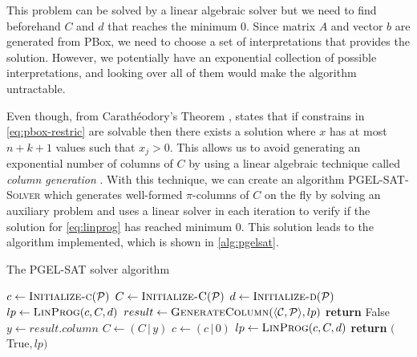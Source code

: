 This problem can be solved by a linear algebraic solver but we need to find beforehand $C$ and $d$ that reaches the minimum 0. Since matrix $A$ and vector $b$ are generated from PBox, we need to choose a set of interpretations that provides the solution. However, we potentially have an exponential collection of possible interpretations, and looking over all of them would make the algorithm untractable. 

Even though, from Carathéodory's Theorem \citep{eckhoff1993helly}, \citet{Fin2020} states that if constrains in \autoref{eq:pbox-restric} are solvable then there exists  a solution where $x$ has at most $n + k + 1$ values such that $x_j > 0$. This allows us to avoid generating an exponential number of columns of $C$ by using a linear algebraic technique called \emph{column generation} \citep{gilmore1961linear,gilmore1963linear}. With this technique, we can create an algorithm \textsc{PGEL-SAT-Solver} which generates well-formed $\pi$-columns of $C$ on the fly by solving an auxiliary problem and uses a linear solver in each iteration to verify if the solution for \autoref{eq:linprog} has reached minimum 0. This solution leads to the algorithm implemented, which is shown in \autoref{alg:pgelsat}.

\begin{algorithm}
	\caption{The PGEL-SAT solver algorithm}
	\label{alg:pgelsat}
	\begin{algorithmic}[1]
		\State $c \gets \Call{Initialize-c}{\PP}$
		\State $C \gets \Call{Initialize-C}{\PP}$
		\State $d \gets \Call{Initialize-d}{\PP}$
		\Statex
		\State $lp \gets \Call{LinProg}{c, C, d}$
		\Statex
		\State $result \gets \Call{GenerateColumn}{\tuple{\CC, \PP}, lp}$
		\State \textbf{return} False 
		\EndIf
		\Statex
		\State $y \gets result.column$ 
		\State $C \gets ( C \, | \, y) $
		\State $c \gets (c \, | \, 0)$
		\State $lp \gets \Call{LinProg}{c, C, d}$
		\EndWhile
		\Statex
		\State \textbf{return} $($True$, lp)$ 
		\EndFunction
	\end{algorithmic}
\end{algorithm}

